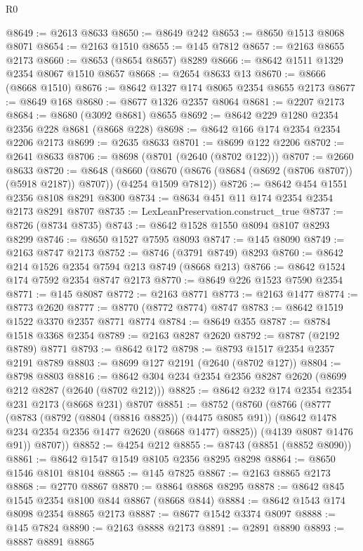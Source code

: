 \begin{lexlean}{R0}
\begin{coremodule}
@8649 := @2613 @8633
@8650 := @8649 @242
@8653 := @8650 @1513 @8068 @8071
@8654 := @2163 @1510
@8655 := @145 @7812
@8657 := @2163 @8655 @2173
@8660 := @8653 (@8654 @8657) @8289
@8666 := @8642 @1511 @1329 @2354 @8067 @1510 @8657
@8668 := @2654 @8633 @13
@8670 := @8666 (@8668 @1510)
@8676 := @8642 @1327 @174 @8065 @2354 @8655 @2173
@8677 := @8649 @168
@8680 := @8677 @1326 @2357 @8064
@8681 := @2207 @2173
@8684 := @8680 (@3092 @8681) @8655
@8692 := @8642 @229 @1280 @2354 @2356 @228 @8681 (@8668 @228)
@8698 := @8642 @166 @174 @2354 @2354 @2206 @2173
@8699 := @2635 @8633
@8701 := @8699 @122 @2206
@8702 := @2641 @8633
@8706 := @8698 (@8701 (@2640 (@8702 @122)))
@8707 := @2660 @8633
@8720 := @8648
    (@8660 (@8670 (@8676 (@8684 (@8692 (@8706 @8707)) (@5918 @2187)) @8707)) (@4254 @1509 @7812))
@8726 := @8642 @454 @1551 @2356 @8108 @8291 @8300
@8734 := @8634 @451 @11 @174 @2354 @2354 @2173 @8291 @8707
@8735 := LexLeanPreservation.construct_true
@8737 := @8726 (@8734 @8735)
@8743 := @8642 @1528 @1550 @8094 @8107 @8293 @8299
@8746 := @8650 @1527 @7595 @8093
@8747 := @145 @8090
@8749 := @2163 @8747 @2173
@8752 := @8746 (@3791 @8749) @8293
@8760 := @8642 @214 @1526 @2354 @7594 @213 @8749 (@8668 @213)
@8766 := @8642 @1524 @174 @7592 @2354 @8747 @2173
@8770 := @8649 @226 @1523 @7590 @2354
@8771 := @145 @8087
@8772 := @2163 @8771
@8773 := @2163 @1477
@8774 := @8773 @2620
@8777 := @8770 (@8772 @8774) @8747
@8783 := @8642 @1519 @1522 @3370 @2357 @8771 @8774
@8784 := @8649 @355
@8787 := @8784 @1518 @3368 @2354
@8789 := @2163 @8287 @2620
@8792 := @8787 (@2192 @8789) @8771
@8793 := @8642 @172
@8798 := @8793 @1517 @2354 @2357 @2191 @8789
@8803 := @8699 @127 @2191 (@2640 (@8702 @127))
@8804 := @8798 @8803
@8816 := @8642 @304 @234 @2354 @2356 @8287 @2620 (@8699 @212 @8287 (@2640 (@8702 @212)))
@8825 := @8642 @232 @174 @2354 @2354 @231 @2173 (@8668 @231) @8707
@8851 := @8752
    (@8760
      (@8766
        (@8777
          (@8783
            (@8792 (@8804 (@8816 @8825)) (@4475 @8085 @91))
            (@8642 @1478 @234 @2354 @2356 @1477 @2620 (@8668 @1477) @8825))
          (@4139 @8087 @1476 @91))
        @8707))
@8852 := @4254 @212
@8855 := @8743 (@8851 (@8852 @8090))
@8861 := @8642 @1547 @1549 @8105 @2356 @8295 @8298
@8864 := @8650 @1546 @8101 @8104
@8865 := @145 @7825
@8867 := @2163 @8865 @2173
@8868 := @2770 @8867
@8870 := @8864 @8868 @8295
@8878 := @8642 @845 @1545 @2354 @8100 @844 @8867 (@8668 @844)
@8884 := @8642 @1543 @174 @8098 @2354 @8865 @2173
@8887 := @8677 @1542 @3374 @8097
@8888 := @145 @7824
@8890 := @2163 @8888 @2173
@8891 := @2891 @8890
@8893 := @8887 @8891 @8865

\end{coremodule}
\end{lexlean}
